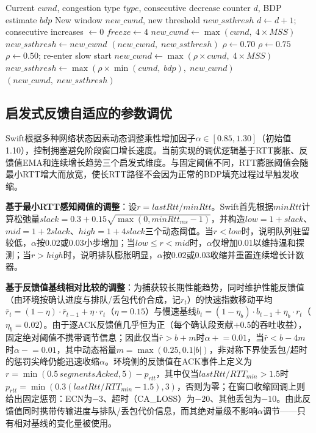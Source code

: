 \documentclass[10pt,twocolumn]{article}
\begin{document}
\begin{algorithm}[htbp]
\caption{Differentiated Congestion Response}
\label{alg:response}
\small
\begin{algorithmic}[1]
\REQUIRE Current $cwnd$, congestion type $type$, consecutive decrease counter $d$, BDP estimate $bdp$
\ENSURE New window $new\_cwnd$, new threshold $new\_ssthresh$
\STATE $d \leftarrow d + 1$; \; consecutive increases $\leftarrow 0$
\STATE $freeze \leftarrow 4$ 
    \STATE $new\_cwnd \leftarrow \max(cwnd, \; 4 \times MSS)$ 
    \STATE $new\_ssthresh \leftarrow new\_cwnd$
    \RETURN $(new\_cwnd, \; new\_ssthresh)$
\ENDIF
{}
    \STATE $\rho \leftarrow 0.70$
    \STATE $\rho \leftarrow 0.75$
    \STATE $\rho \leftarrow 0.50$; \; re-enter slow start
\ENDIF
\STATE $new\_cwnd \leftarrow \max(\rho \times cwnd, \; 4 \times MSS)$
\STATE $new\_ssthresh \leftarrow \max(\rho \times \min(cwnd, \; bdp), \; new\_cwnd)$
\RETURN $(new\_cwnd, \; new\_ssthresh)$
\end{algorithmic}
\end{algorithm}

\subsection{启发式反馈自适应的参数调优}
\label{subsubsec:alpha}

Swift根据多种网络状态因素动态调整乘性增加因子$\alpha \in [0.85, 1.30]$（初始值1.10），控制拥塞避免阶段窗口增长速度。当前实现的调优逻辑基于RTT膨胀、反馈值EMA和连续增长趋势三个启发式维度。与固定阈值不同，RTT膨胀阈值会随最小RTT增大而放宽，使长RTT路径不会因为正常的BDP填充过程过早触发收缩。

\textbf{基于最小RTT感知阈值的调整}：设$r = lastRtt/minRtt$。Swift首先根据$minRtt$计算松弛量$slack = 0.3 + 0.15\sqrt{\max(0,minRtt_{ms}-1)}$，并构造$low=1+slack$、$mid=1+2slack$、$high=1+4slack$三个动态阈值。当$r < low$时，说明队列驻留较低，$\alpha$按0.02或0.03小步增加；当$low \leq r < mid$时，$\alpha$仅增加0.01以维持温和探测；当$r > high$时，说明排队膨胀明显，$\alpha$按0.02或0.03收缩并重置连续增长计数器。

\textbf{基于反馈值基线相对比较的调整}：为捕获较长期性能趋势，同时维护性能反馈值（由环境按确认进度与排队/丢包代价合成，记$r_t$）的快速指数移动平均$\bar{r}_t = (1 - \eta) \cdot \bar{r}_{t-1} + \eta \cdot r_t$（$\eta=0.15$）与慢速基线$b_t = (1 - \eta_b) \cdot b_{t-1} + \eta_b \cdot r_t$（$\eta_b=0.02$）。由于逐ACK反馈值几乎恒为正（每个确认段贡献$+0.5$的吞吐收益），固定绝对阈值不携带调节信息；因此仅当$\bar{r} > b + m$时$\alpha \mathrel{+}=0.01$，当$\bar{r} < b - 4m$时$\alpha \mathrel{-}=0.01$，其中动态裕量$m = \max(0.25, 0.1|b|)$，非对称下界使丢包/超时的惩罚尖峰仍能迅速收缩$\alpha$。环境侧的反馈值在ACK事件上定义为$r = \min(0.5\,segmentsAcked, 5) - p_{rtt}$，其中仅当$lastRtt/RTT_{min}>1.5$时$p_{rtt}=\min(0.3(lastRtt/RTT_{min}-1.5), 3)$，否则为零；在窗口收缩回调上则给出固定惩罚：ECN为$-3$、超时（CA\_LOSS）为$-20$、其他丢包为$-10$。由此反馈值同时携带传输进度与排队/丢包代价信息，而其绝对量级不影响$\alpha$调节——只有相对基线的变化量被使用。
\end{document}
